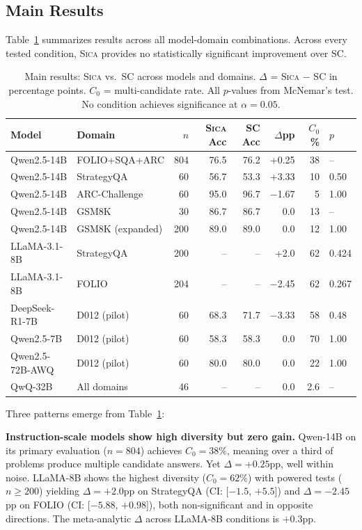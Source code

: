 \documentclass[11pt,a4paper]{article}
\newcommand{\sica}{\textsc{Sica}}
\begin{document}
\subsection{Main Results}
\label{sec:main_results}

Table~\ref{tab:main} summarizes results across all model-domain combinations.
Across every tested condition, \sica{} provides no statistically significant improvement over SC.

\begin{table}[t]
\centering
\caption{Main results: \sica{} vs.\ SC across models and domains. $\Delta$ = \sica{} $-$ SC in percentage points. $C_0$ = multi-candidate rate. All $p$-values from McNemar's test. No condition achieves significance at $\alpha=0.05$.}
\label{tab:main}
\small
\begin{tabular}{llrrrrrl}
\toprule
\textbf{Model} & \textbf{Domain} & \textbf{$n$} & \textbf{\sica{} Acc} & \textbf{SC Acc} & \textbf{$\Delta$pp} & \textbf{$C_0$\%} & \textbf{$p$} \\
\midrule
Qwen2.5-14B & FOLIO+SQA+ARC & 804 & 76.5 & 76.2 & +0.25 & 38 & -- \\
Qwen2.5-14B & StrategyQA & 60 & 56.7 & 53.3 & +3.33 & 10 & 0.50 \\
Qwen2.5-14B & ARC-Challenge & 60 & 95.0 & 96.7 & $-$1.67 & 5 & 1.00 \\
Qwen2.5-14B & GSM8K & 30 & 86.7 & 86.7 & 0.0 & 13 & -- \\
Qwen2.5-14B & GSM8K (expanded) & 200 & 89.0 & 89.0 & 0.0 & 12 & 1.00 \\
\midrule
LLaMA-3.1-8B & StrategyQA & 200 & -- & -- & +2.0 & 62 & 0.424 \\
LLaMA-3.1-8B & FOLIO & 204 & -- & -- & $-$2.45 & 62 & 0.267 \\
\midrule
DeepSeek-R1-7B & D012 (pilot) & 60 & 68.3 & 71.7 & $-$3.33 & 58 & 0.48 \\
\midrule
Qwen2.5-7B & D012 (pilot) & 60 & 58.3 & 58.3 & 0.0 & 70 & 1.00 \\
Qwen2.5-72B-AWQ & D012 (pilot) & 60 & 80.0 & 80.0 & 0.0 & 22 & 1.00 \\
\midrule
QwQ-32B & All domains & 46 & -- & -- & 0.0 & 2.6 & -- \\
\bottomrule
\end{tabular}
\end{table}

Three patterns emerge from Table~\ref{tab:main}:

\textbf{Instruction-scale models show high diversity but zero gain.}
Qwen-14B on its primary evaluation ($n=804$) achieves $C_0=38\%$, meaning over a third of problems produce multiple candidate answers.
Yet $\Delta=+0.25$pp, well within noise.
LLaMA-8B shows the highest diversity ($C_0=62\%$) with powered tests ($n\geq200$) yielding $\Delta=+2.0$pp on StrategyQA (CI: [$-1.5$, $+5.5$]) and $\Delta=-2.45$pp on FOLIO (CI: [$-5.88$, $+0.98$]), both non-significant and in opposite directions.
The meta-analytic $\Delta$ across LLaMA-8B conditions is $+0.3$pp.
\end{document}
